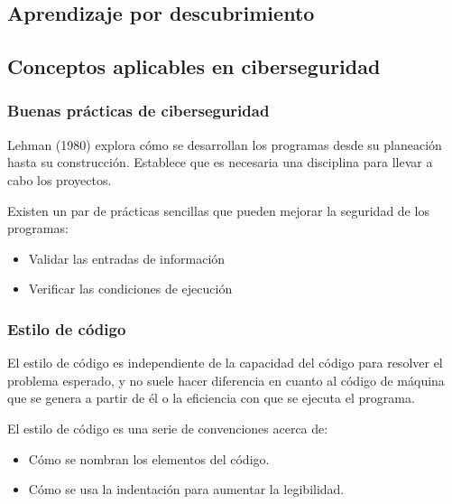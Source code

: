 \documentclass[
  12,
]{scrartcl}
\providecommand{\tightlist}{%
  \setlength{\itemsep}{0pt}\setlength{\parskip}{0pt}}
\begin{document}
\hypertarget{aprendizaje-por-descubrimiento}{%
\subsection{Aprendizaje por
descubrimiento}\label{aprendizaje-por-descubrimiento}}

\hypertarget{conceptos-aplicables-en-ciberseguridad}{%
\subsection{Conceptos aplicables en
ciberseguridad}\label{conceptos-aplicables-en-ciberseguridad}}

\hypertarget{buenas-pruxe1cticas-de-ciberseguridad}{%
\subsubsection{Buenas prácticas de
ciberseguridad}\label{buenas-pruxe1cticas-de-ciberseguridad}}

Lehman (1980) explora cómo se desarrollan los programas desde su
planeación hasta su construcción. Establece que es necesaria una
disciplina para llevar a cabo los proyectos.

Existen un par de prácticas sencillas que pueden mejorar la seguridad de
los programas:

\begin{itemize}
\tightlist
\item
  Validar las entradas de información
\item
  Verificar las condiciones de ejecución
\end{itemize}

\hypertarget{estilo-de-cuxf3digo}{%
\subsubsection{Estilo de código}\label{estilo-de-cuxf3digo}}

El estilo de código es independiente de la capacidad del código para
resolver el problema esperado, y no suele hacer diferencia en cuanto al
código de máquina que se genera a partir de él o la eficiencia con que
se ejecuta el programa.

El estilo de código es una serie de convenciones acerca de:

\begin{itemize}
\tightlist
\item
  Cómo se nombran los elementos del código.
\item
  Cómo se usa la indentación para aumentar la legibilidad.
\end{itemize}
\end{document}
